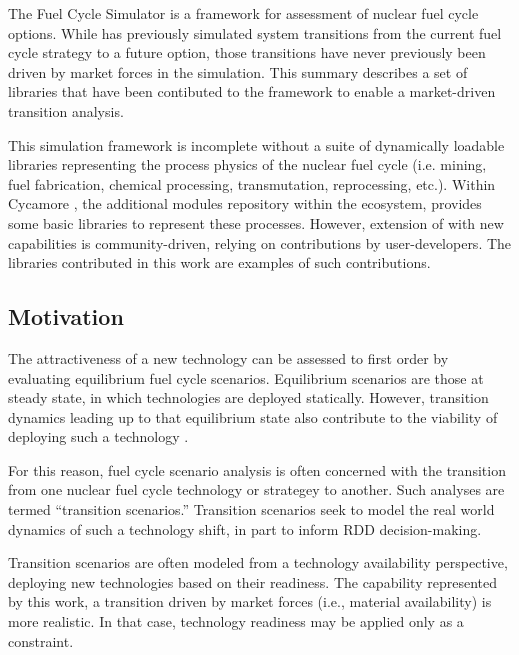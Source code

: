 
The \Cyclus Fuel Cycle Simulator \cite{carlsen_cyclus_2014} is a framework for 
assessment of nuclear fuel cycle options. While \Cyclus has previously 
simulated \cite{gidden_inpro_2013} system 
transitions from the current fuel cycle strategy to a future option, those 
transitions have never previously been driven by market forces in the 
simulation.  This summary describes a set of libraries that have been 
contibuted to the \Cyclus framework to enable a market-driven transition 
analysis.

This simulation framework is incomplete without a suite of dynamically loadable 
libraries representing the process physics of the nuclear fuel cycle (i.e.  
mining, fuel fabrication, chemical processing, transmutation, reprocessing, 
etc.).  Within 
Cycamore \cite{carlsen_cycamore_2014}, the additional modules repository within 
the \Cyclus ecosystem, provides some basic 
libraries to represent these processes. However, extension of \Cyclus with new 
capabilities is community-driven, relying on contributions by user-developers. 
The libraries contributed in this work are examples of such contributions.

\subsection{Motivation}

The attractiveness of a new technology can be assessed to first order by 
evaluating equilibrium fuel cycle scenarios. Equilibrium scenarios are those 
at steady state, in which technologies are deployed statically. However, 
transition dynamics leading up to that equilibrium state also contribute to 
the viability of deploying such a technology \cite{piet_dynamic_2011}.  

For this reason, fuel cycle scenario analysis is often concerned with the 
transition from one nuclear fuel cycle technology or strategey to another. Such 
analyses are termed ``transition scenarios.''  Transition scenarios seek to 
model the real world dynamics of such a technology shift, in part to inform 
\gls{RDD} decision-making. 

Transition scenarios are often modeled from a technology availability 
perspective, deploying new technologies based on their readiness.  The 
capability represented by this work, a transition 
driven by market forces (i.e., material availability) is more realistic. In 
that case, technology readiness may be applied only as a constraint. 


